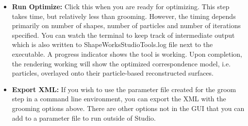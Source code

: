 \documentclass[letterpaper,12pt]{article}   %
\begin{document}
\begin{itemize}
\item \textbf{Run Optimize:} Click this when you are ready for optimizing. This step takes time, but relatively less than grooming. However, the timing depends primarily on number of shapes, number of particles and number of iterations specified. You can watch the terminal to keep track of intermediate output which is also written to ShapeWorksStudioTools.log file next to the executable. A progress indicator shows the tool is working. Upon completion, the rendering working will show the optimized correspondence model, i.e. particles, overlayed onto their particle-based reconstructed surfaces.

\item \textbf{Export XML:} If you wish to use the parameter file created for the groom step in a command line environment, you can export the XML with the grooming options above. There are other options not in the GUI that you can add to a parameter file to run outside of Studio.
\end{itemize}
\end{document}
